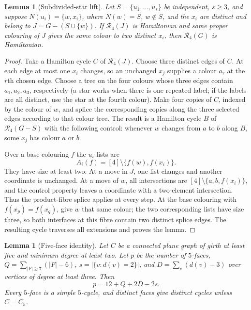 \documentclass[11pt]{article}
\newtheorem{lemma}[theorem]{Lemma}
\theoremstyle{remark}
\newcommand{\R}{\mathcal R}
\numberwithin{equation}{section}
\begin{document}
\begin{lemma}[Subdivided-star lift]
\label{lem:subdivided-star-four-subclass}
Let $S=\{u_1,\ldots,u_s\}$ be independent, $s\ge3$, and suppose
$N(u_i)=\{w,x_i\}$, where $N(w)=S$, $w\notin S$, and the $x_i$ are distinct and belong to
$J=G-(S\cup\{w\})$.  If $\R_4(J)$ is Hamiltonian and some proper colouring
of $J$ gives the same colour to two distinct $x_i$, then $\R_4(G)$ is
Hamiltonian.
\end{lemma}

\begin{proof}
Take a Hamilton cycle $C$ of $\R_4(J)$.  Choose three distinct edges of
$C$.  At each edge at most one $x_i$ changes, so an unchanged $x_j$ supplies
a colour $a_r$ at the $r$th chosen edge.  Choose a tree on the four colours
whose three edges contain $a_1,a_2,a_3$, respectively (a star works when
there is one repeated label; if the labels are all distinct, use the star
at the fourth colour).  Make four copies of $C$, indexed by the colour of
$w$, and splice the corresponding copies along the three selected edges
according to that colour tree.  The result is a Hamilton cycle $B$ of
$\R_4(G-S)$ with the following control: whenever $w$ changes from $a$ to $b$
along $B$, some $x_j$ has colour $a$ or $b$.

Over a base colouring $f$ the $u_i$-lists are
\[
 A_i(f)=[4]\setminus\{f(w),f(x_i)\}.
\]
They have size at least two.  At a move in $J$, one list changes and another
coordinate is unchanged.  At a move of $w$, all intersections are
$[4]\setminus\{a,b,f(x_i)\}$, and the control property leaves a coordinate
with a two-element intersection.  Thus the product-fibre splice applies at
every step.  At the base colouring with $f(x_p)=f(x_q)$, give $w$ that same
colour; the two corresponding lists have size three, so both interfaces at
this fibre contain two distinct splice edges.  The resulting cycle traverses
all extensions and proves the lemma.
\end{proof}

\begin{lemma}[Five-face identity]
\label{lem:five-face-identity-subclass}
Let $C$ be a connected plane graph of girth at least five and minimum degree
at least two.  Let $p$ be the number of $5$-faces,
$Q=\sum_{|F|\ge7}(|F|-6)$, $s=|\{v:d(v)=2\}|$, and
$D=\sum_v(d(v)-3)$ over vertices of degree at least three.  Then
\[
 p=12+Q+2D-2s.
\]
Every $5$-face is a simple $5$-cycle, and distinct faces give distinct
cycles unless $C=C_5$.
\end{lemma}
\end{document}
